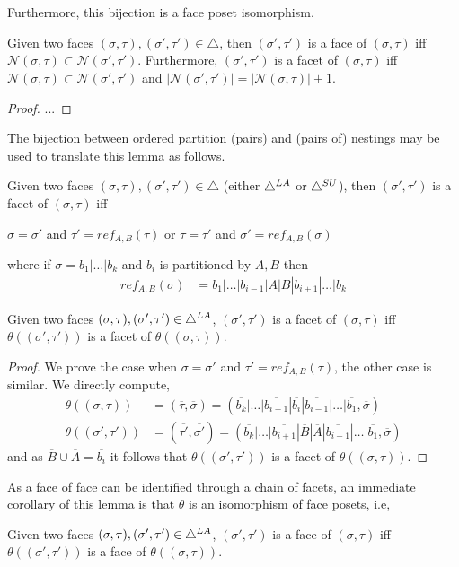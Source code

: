 \\\\
Furthermore, this bijection is a face poset isomorphism.  
\begin{lemma}
Given two faces $(\sigma,\tau),(\sigma',\tau') \in \triangle$, then $(\sigma',\tau')$ is a face of $(\sigma,\tau) $ iff $\mathcal{N}(\sigma,\tau) \subset \mathcal{N}(\sigma',\tau')$. Furthermore, $(\sigma',\tau')$ is a facet of $(\sigma,\tau) $ iff $\mathcal{N}(\sigma,\tau) \subset \mathcal{N}(\sigma',\tau')$ and $|\mathcal{N}(\sigma',\tau')| = |\mathcal{N}(\sigma,\tau)|+1$.
\end{lemma}
\begin{proof}
...
\end{proof}
The bijection between ordered partition (pairs) and (pairs of) nestings may be used to translate this lemma as follows. 
\begin{corollary}
Given two faces $(\sigma,\tau),(\sigma',\tau') \in \triangle$ (either $\triangle^{LA}$ or $\triangle^{SU}$), then
$(\sigma',\tau')$ is a facet of $(\sigma,\tau)$ iff 
\begin{center}
$\sigma = \sigma'$ and $\tau' = ref_{A,B}(\tau)$ or $\tau = \tau'$ and $\sigma' = ref_{A,B}(\sigma)$
\end{center}
where if $\sigma = b_1|\dots|b_k$ and $b_i$ is partitioned by $A,B$ then
\begin{align*}
    ref_{A,B}(\sigma) &= b_1|\dots|b_{i-1}|A|B|b_{i+1}|\dots|b_k
\end{align*}
\end{corollary}

\begin{lemma}
Given two faces $(\sigma,\tau),(\sigma',\tau') \in \triangle^{LA}$,
$(\sigma',\tau')$ is a facet of $(\sigma,\tau)$ iff $\theta((\sigma',\tau'))$ is a facet of $\theta((\sigma,\tau))$.
\end{lemma}
\begin{proof}
We prove the case when $\sigma = \sigma'$ and $\tau' = ref_{A,B}(\tau)$, the other case is similar. We directly compute,
\begin{align*}
    \theta( (\sigma,\tau)) &= (\overline{\tau},\overline{\sigma}) = (\overline{b_k}|\dots|\overline{b_{i+1}}|\overline{b_i}|\overline{b_{i-1}}|\dots|\overline{b_1},\overline{\sigma})\\
    \theta( (\sigma',\tau')) &= (\overline{\tau'},\overline{\sigma'}) = (\overline{b_k}|\dots|\overline{b_{i+1}}|\overline{B}|\overline{A}|\overline{b_{i-1}}|\dots|\overline{b_1},\overline{\sigma})
\end{align*}
and as $\overline{B}\cup\overline{A}=\overline{b_i}$ it follows that $\theta((\sigma',\tau'))$ is a facet of $\theta((\sigma,\tau))$.
\end{proof}
As a face of face can be identified through a chain of facets, an immediate corollary of this lemma is that $\theta$ is an isomorphism of face posets, i.e,
\begin{corollary}
Given two faces $(\sigma,\tau),(\sigma',\tau') \in \triangle^{LA}$,
$(\sigma',\tau')$ is a face of $(\sigma,\tau)$ iff $\theta((\sigma',\tau'))$ is a face of $\theta((\sigma,\tau))$. 
\end{corollary}

